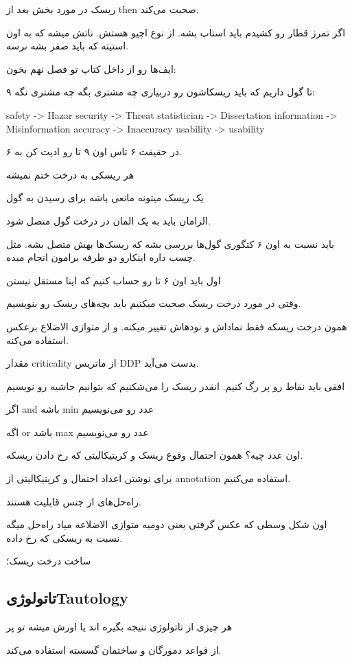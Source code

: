 ریسک در مورد بخش بعد از then صحبت می‌کند.

اگر تمرز قطار رو کشیدم باید استاپ بشه. از نوع اچیو هستش. ناتش میشه که به اون
استیته که باید صفر بشه نرسه.

ایف‌ها رو از داخل کتاب تو فصل نهم بخون:

۹ تا گول داریم که باید ریسکاشون رو دربیاری چه مشتری بگه چه مشتری نگه:

safety -> Hazar
security -> Threat
statistician -> Dissertation
information -> Misinformation
accuracy -> Inaccuracy
usability -> usability

در حقیقت ۶ تاس اون ۹ تا رو ادیت کن به ۶.

هر ریسکی به درخت ختم نمیشه

یک ریسک میتونه مانعی باشه برای رسیدن به گول

الزامان باید به یک المان در درخت گول متصل شود.

باید نسبت به اون ۶ کتگوری گول‌ها بررسی بشه که ریسک‌ها بهش متصل بشه.
مثل چسب داره اینکارو دو طرفه برامون انجام میده.

اول باید اون ۶ تا رو حساب کنیم که اینا مستقل نیستن

وقتی در مورد درخت ریسک صحبت میکنیم باید بچه‌های ریسک رو بنویسیم.

همون درخت ریسکه فقط نماداش و نود‌هاش تغییر میکنه. و از متوازی الاضلاع برعکس
استفاده می‌کنه.

مقدار criticality از ماتریس DDP بدست می‌آید.

افقی باید نقاط رو پر رگ کنیم.
انقدر ریسک را می‌شکنیم که بتوانیم حاشیه رو نویسیم

اگر and باشه min عدد رو می‌نویسیم

اگه or باشد max عدد رو می‌نویسیم

اون عدد چیه؟ همون احتمال وقوع ریسک و کریتیکالیتی که رخ دادن ریسکه.

برای نوشتن اعداد احتمال و کریتیکالیتی از annotation استفاده می‌کنیم.

راه‌حل‌های از جنس قابلیت هستند.

اون شکل وسطی که عکس گرفتی یعنی دومیه متوازی الاضلاعه میاد راه‌حل میگه نسبت به
ریسکی که رخ داده.

ساخت درخت ریسک؛

\subsection{تاتولوژیTautology}

هر چیزی از تاتولوژی نتیجه بگیره اند یا اورش میشه تو پر

از قواعد دمورگان و ساختمان گسسته استفاده می‌کند.

